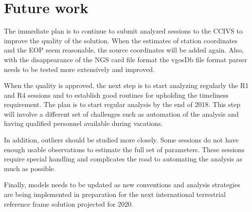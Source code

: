 \documentclass[twocolumn,twoside]{svmultivs_gm} %
\begin{document}
\section{Future work}

The immediate plan is to continue to submit analyzed sessions to the CCIVS to improve the quality of
the solution. When the estimates of station coordinates and the EOP seem reasonable, the source coordinates will be
added again. Also, with the disappearance of the NGS card file format the vgosDb file format parser needs to be tested
more extensively and improved.

When the quality is approved, the next step is to start analyzing regularly the R1 and R4 sessions and to establish good
routines for upholding the timeliness requirement. The plan is to start regular analysis by the end of 2018. This step
will involve a different set of challenges such as automation of the analysis and having qualified personnel available
during vacations.

In addition, outliers should be studied more closely. Some sessions do not have enough usable observations to estimate
the full set of parameters. These sessions require special handling and complicates the road to automating the analysis
as much as possible.

Finally, models needs to be updated as new conventions and analysis strategies are being implemented in preparation for
the next international terrestrial reference frame solution projected for 2020. 




\end{document}
